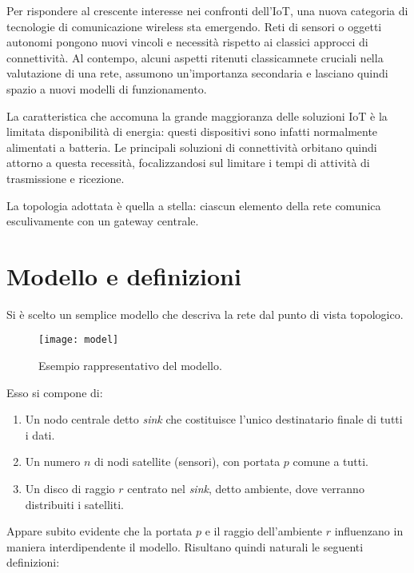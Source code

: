 \documentclass[a4paper,12pt]{article}
\theoremstyle{definition}
\begin{document}

Per rispondere al crescente interesse nei confronti dell'IoT, una nuova categoria di tecnologie di comunicazione wireless sta emergendo. Reti di sensori o oggetti autonomi pongono nuovi vincoli e necessità rispetto ai classici approcci di connettività. Al contempo, alcuni aspetti ritenuti classicamnete cruciali nella valutazione di una rete, assumono un'importanza secondaria e lasciano quindi spazio a nuovi modelli di funzionamento.


La caratteristica che accomuna la grande maggioranza delle soluzioni IoT è la limitata disponibilità di energia: questi dispositivi sono infatti normalmente alimentati a batteria. Le principali soluzioni di connettività orbitano quindi attorno a questa recessità, focalizzandosi sul limitare i tempi di attività di trasmissione e ricezione.

La topologia adottata è quella a stella: ciascun elemento della rete comunica esculivamente con un gateway centrale.

\section{Modello e definizioni}

Si è scelto un semplice modello che descriva la rete dal punto di vista topologico.

\begin{figure}[h]
\centering
\texttt{[image: model]}
\caption{Esempio rappresentativo del modello.}
\end{figure}

Esso si compone di:

\begin{enumerate}
\item Un nodo centrale detto \emph{sink} che costituisce l'unico destinatario finale di tutti i dati.
\item Un numero $n$ di nodi satellite (sensori), con portata $p$ comune a tutti.
\item Un disco di raggio $r$ centrato nel \emph{sink}, detto ambiente, dove verranno distribuiti i satelliti.
\end{enumerate}

Appare subito evidente che la portata $p$ e il raggio dell'ambiente $r$ influenzano in maniera interdipendente il modello. Risultano quindi naturali le seguenti definizioni:
\end{document}
